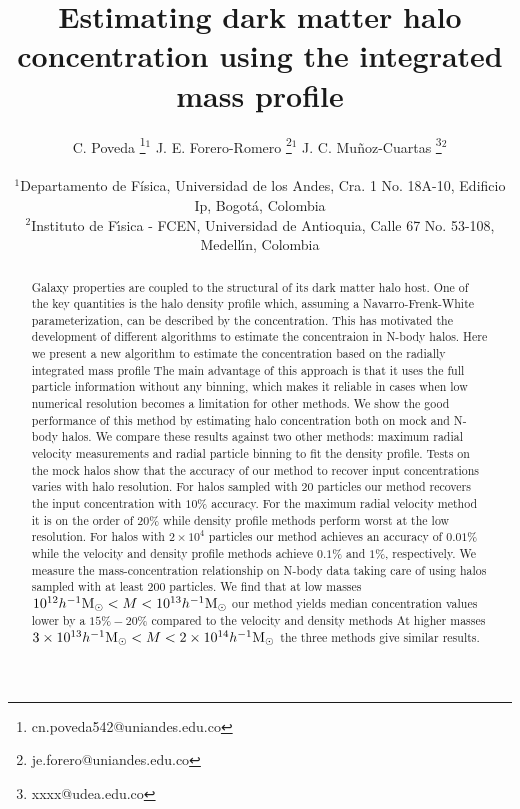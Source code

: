\documentclass[a4,useAMS,usenatbib,usegraphicx]{mn2e}
\newcommand{\hMsun}{{\ifmmode{h^{-1}{\rm {M_{\odot}}}}\else{$h^{-1}{\rm{M_{\odot}}}$}\fi}}
\begin{document}
\title{Estimating dark matter halo concentration using the integrated
  mass profile} 
\author[C. Poveda, J.E. Forero-Romero, J.C. Mu\~noz-Cuartas]{
\parbox[t]{\textwidth}{\raggedright 
  C. Poveda \thanks{cn.poveda542@uniandes.edu.co}$^{1}$
  J. E. Forero-Romero \thanks{je.forero@uniandes.edu.co}$^{1}$
  J. C. Mu\~noz-Cuartas \thanks{xxxx@udea.edu.co}$^{2}$
}
\vspace*{6pt}\\
$^1$Departamento de F\'{i}sica, Universidad de los Andes, Cra. 1
No. 18A-10, Edificio Ip, Bogot\'a, Colombia\\
$^2$Instituto de F\'{\i}sica - FCEN, Universidad de Antioquia, Calle
67 No. 53-108, Medell\'{\i}n, Colombia
}

\maketitle

\begin{abstract}


Galaxy properties are coupled to the structural of its dark
matter halo host. 
One of the key quantities is the halo density profile which, assuming
a  Navarro-Frenk-White parameterization, can be described by the
concentration.
This has motivated the development of different algorithms to estimate
the concentraion in N-body halos.
Here we present a new algorithm to estimate the concentration
based on the radially integrated mass profile
The main advantage of this approach is that it uses the full
particle information without any binning, which makes it reliable in
cases when low numerical resolution becomes a limitation for other
methods.   
We show the good performance of this method by estimating halo
concentration both on mock and N-body halos. 
We compare these results against two other methods:
maximum radial velocity measurements and radial particle binning to
fit the density profile. 
Tests on  the mock halos show that the accuracy of our method to recover input
concentrations varies with halo resolution. For halos
sampled with $20$ particles our method recovers the input
concentration with $10\%$ accuracy. 
For the maximum radial velocity method it is on the order of $20\%$
while density profile methods perform worst at the low resolution.
For halos with $2\times 10^4$ particles our method achieves an
accuracy of $0.01\%$ while the velocity and density profile methods
achieve $0.1\%$ and $1\%$, respectively. 
We measure the mass-concentration relationship on N-body
data taking care of using halos sampled with at least $200$
particles. We find that at low masses $10^{12}\hMsun <
M<10^{13}\hMsun$ our method yields median concentration values lower
by a $15\%-20\%$ compared to the velocity and density methods 
At higher masses $3\times 10^{13}\hMsun < M < 2\times
10^{14}\hMsun$ the three methods give similar results.
\end{abstract}
\end{document}
